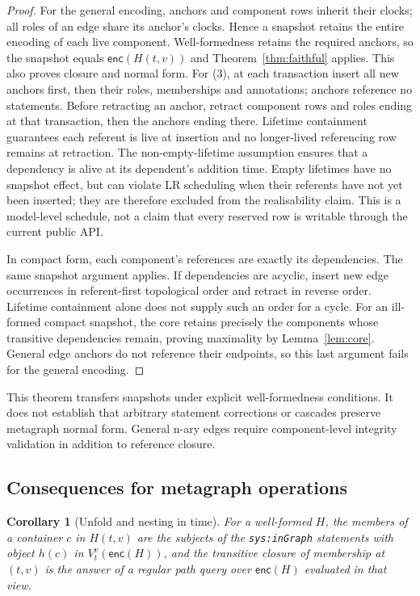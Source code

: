 \documentclass[11pt]{article}
\theoremstyle{plain}
\newtheorem{corollary}[theorem]{Corollary}
\theoremstyle{definition}
\theoremstyle{remark}
\newcommand{\View}[2]{V_{#1}^{#2}}
\newcommand{\enc}{\mathsf{enc}}
\newcommand{\sys}[1]{\texttt{sys:#1}}
\begin{document}
\begin{proof}
For the general encoding, anchors and component rows inherit their clocks;
all roles of an edge share its anchor's clocks. Hence a snapshot retains the
entire encoding of each live component. Well-formedness retains the required
anchors, so the snapshot equals $\enc(H(t,v))$ and Theorem~\ref{thm:faithful}
applies. This also proves closure and normal form.
For (3), at each transaction insert all new anchors first, then their roles,
memberships and annotations; anchors reference no statements. Before retracting
an anchor, retract component rows and roles ending at that transaction, then
the anchors ending there. Lifetime containment guarantees each referent is live
at insertion and no longer-lived referencing row remains at retraction. The non-empty-lifetime assumption ensures that a dependency is alive at its
dependent's addition time. Empty lifetimes have no snapshot effect, but can
violate LR scheduling when their referents have not yet been inserted; they
are therefore excluded from the realisability claim.
This is a model-level schedule, not a claim that every reserved row is writable
through the current public API.

In compact form, each component's references are exactly its dependencies.
The same snapshot argument applies. If dependencies are acyclic, insert new
edge occurrences in referent-first topological order and retract in reverse
order. Lifetime containment alone does not supply such an order for a cycle.
For an ill-formed compact snapshot, the core retains precisely the components
whose transitive dependencies remain, proving maximality by Lemma~\ref{lem:core}.
General edge anchors do not reference their endpoints, so this last argument
fails for the general encoding.
\end{proof}

This theorem transfers snapshots under explicit well-formedness conditions.
It does not establish that arbitrary statement corrections or cascades preserve
metagraph normal form. General n-ary edges require component-level integrity
validation in addition to reference closure.

\subsection{Consequences for metagraph operations}

\begin{corollary}[Unfold and nesting in time]\label{cor:unfold}
For a well-formed $H$, the members of a container $c$ in $H(t,v)$ are the
subjects of the \sys{inGraph} statements with object $h(c)$ in
$\View{t}{v}(\enc(H))$, and the transitive closure of membership at $(t,v)$ is the
answer of a regular path query over $\enc(H)$ evaluated in that view.
\end{corollary}
\end{document}
